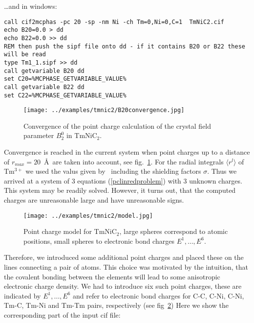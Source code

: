 \dots and in windows:

\begin{verbatim}
call cif2mcphas -pc 20 -sp -nm Ni -ch Tm=0,Ni=0,C=1  TmNiC2.cif 
echo B20=0.0 > dd
echo B22=0.0 >> dd
REM then push the sipf file onto dd - if it contains B20 or B22 these will be read
type Tm1_1.sipf >> dd
call getvariable B20 dd
set C20=%MCPHASE_GETVARIABLE_VALUE%
call getvariable B22 dd
set C22=%MCPHASE_GETVARIABLE_VALUE%
\end{verbatim}


\begin{figure}[htb]%
\begin{center}\leavevmode
\texttt{[image: ../examples/tmnic2/B20convergence.jpg]}
\end{center}
\caption{Convergence of the point charge calculation of the crystal field parameter $B_2^0$ in TmNiC$_2$.}
\label{B20convergence}
\end{figure}

Convergence is reached in the current
system when point charges up to a distance of $r_{max}=20$~\AA\  are taken into account, see fig.~\ref{B20convergence}. For the
radial integrals $\langle r^l \rangle$ of Tm$^{3+}$ we used the valus given by~\cite{edvardsson98-230} including
the shielding factors $\sigma$.
Thus we arrived at a system of 3 equations (\ref{pclinredproblem}) with 3 unknown charges. This system may be readily solved. However,
it turns out, that the computed charges are unreasonable large and have unreasonable signs.

\begin{figure}[htb]%
\begin{center}\leavevmode
\texttt{[image: ../examples/tmnic2/model.jpg]}
\end{center}
\caption{Point charge model for TmNiC$_2$, large spheres correspond to atomic positions, small spheres to
electronic bond charges $E^1, \dots, E^6$.}
\label{modelTmNiC2}
\end{figure}

Therefore, we introduced some additional point charges and placed these on the lines connecting
a pair of atoms. This choice was motivated by the intuition, that the covalent bonding between
the elements will lead to some anisotropic electronic charge density. We had to introduce 
six such point charges, these are indicated by $E^1, \dots, E^6$ and refer to electronic bond
charges for  C-C, C-Ni, C-Ni, Tm-C, Tm-Ni and Tm-Tm pairs, respectively (see fig~\ref{modelTmNiC2}) 
 Here we show the corresponding part of the input cif file:

